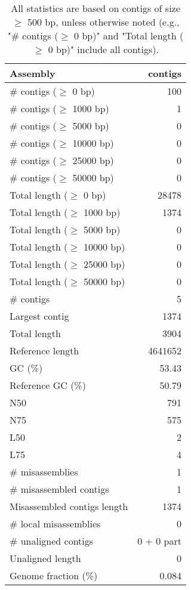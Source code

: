 \documentclass[12pt,a4paper]{article}
\begin{document}
\begin{table}[ht]
\begin{center}
\caption{All statistics are based on contigs of size $\geq$ 500 bp, unless otherwise noted (e.g., "\# contigs ($\geq$ 0 bp)" and "Total length ($\geq$ 0 bp)" include all contigs).}
\begin{tabular}{|l*{1}{|r}|}
\hline
Assembly & contigs \\ \hline
\# contigs ($\geq$ 0 bp) & 100 \\ \hline
\# contigs ($\geq$ 1000 bp) & 1 \\ \hline
\# contigs ($\geq$ 5000 bp) & 0 \\ \hline
\# contigs ($\geq$ 10000 bp) & 0 \\ \hline
\# contigs ($\geq$ 25000 bp) & 0 \\ \hline
\# contigs ($\geq$ 50000 bp) & 0 \\ \hline
Total length ($\geq$ 0 bp) & 28478 \\ \hline
Total length ($\geq$ 1000 bp) & 1374 \\ \hline
Total length ($\geq$ 5000 bp) & 0 \\ \hline
Total length ($\geq$ 10000 bp) & 0 \\ \hline
Total length ($\geq$ 25000 bp) & 0 \\ \hline
Total length ($\geq$ 50000 bp) & 0 \\ \hline
\# contigs & 5 \\ \hline
Largest contig & 1374 \\ \hline
Total length & 3904 \\ \hline
Reference length & 4641652 \\ \hline
GC (\%) & 53.43 \\ \hline
Reference GC (\%) & 50.79 \\ \hline
N50 & 791 \\ \hline
N75 & 575 \\ \hline
L50 & 2 \\ \hline
L75 & 4 \\ \hline
\# misassemblies & 1 \\ \hline
\# misassembled contigs & 1 \\ \hline
Misassembled contigs length & 1374 \\ \hline
\# local misassemblies & 0 \\ \hline
\# unaligned contigs & 0 + 0 part \\ \hline
Unaligned length & 0 \\ \hline
Genome fraction (\%) & 0.084 \\ \hline

\end{tabular}
\end{center}
\end{table}
\end{document}

